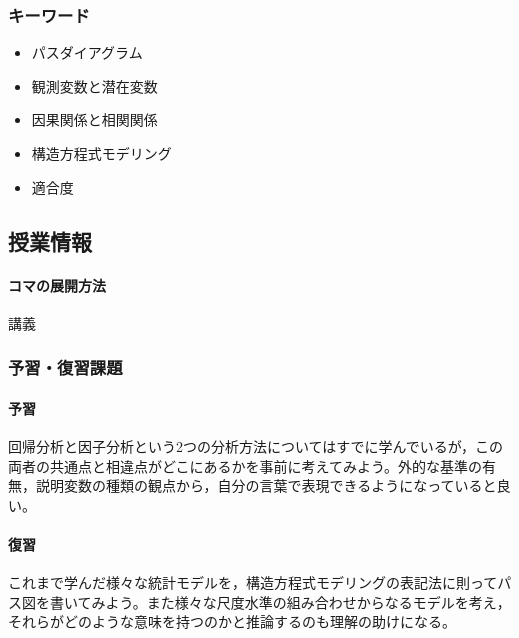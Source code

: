\subsubsection{キーワード}
\begin{itemize}
    \item パスダイアグラム
    \item 観測変数と潜在変数
    \item 因果関係と相関関係
    \item 構造方程式モデリング
    \item 適合度
    \end{itemize}
\subsection{授業情報}
\paragraph{コマの展開方法}
講義
\subsubsection{予習・復習課題}
\paragraph{予習} 回帰分析と因子分析という2つの分析方法についてはすでに学んでいるが，この両者の共通点と相違点がどこにあるかを事前に考えてみよう。外的な基準の有無，説明変数の種類の観点から，自分の言葉で表現できるようになっていると良い。
\paragraph{復習} これまで学んだ様々な統計モデルを，構造方程式モデリングの表記法に則ってパス図を書いてみよう。また様々な尺度水準の組み合わせからなるモデルを考え，それらがどのような意味を持つのかと推論するのも理解の助けになる。
